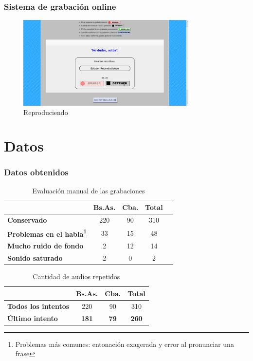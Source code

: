 \documentclass[mathserif]{beamer}%
\begin{document}
\begin{frame}
	\frametitle{Sistema de grabación online}
	
	\begin{figure}[h!]
		\centerline{\includegraphics[width=0.8\textwidth]{pag-play1} }
		\caption{Reproduciendo}
		\label{figEncuesta}
	\end{figure}
\end{frame}

\section{Datos}

\begin{frame}
	\frametitle{Datos obtenidos}
	
	\begin{table}[h]
		\centering
		\begin{tabular}{|l|c|c|c|c|}
			\hline
			\textbf{}  & \textbf{Bs.As. } & \textbf{Cba.} & \textbf{Total} \\ \hline
			\textbf{Conservado}  & 220 & 90 & 310 \\ \hline
			\textbf{Problemas en el habla\footnote{Problemas más comunes: entonación exagerada y error al pronunciar una frase}}  & 33 & 15 & 48 \\ \hline
			\textbf{Mucho ruido de fondo}  & 2 & 12 & 14 \\ \hline
			\textbf{Sonido saturado}  & 2 & 0 & 2 \\ \hline
		\end{tabular}
		\caption{Evaluación manual de las grabaciones}
		\label{eva_table}
	\end{table}
	
	\begin{table}[H]
		\centering
		\begin{tabular}{|l|c|c|c|}
			\hline
			\textbf{}  & \textbf{Bs.As. } & \textbf{Cba.} & \textbf{Total} \\ \hline
			\textbf{Todos los intentos}  & 220 & 90 & 310 \\ \hline
			\cellcolor{blue!25}\textbf{Último intento}  & \cellcolor{blue!25}\textbf{181} & \cellcolor{blue!25}\textbf{79} & \cellcolor{blue!25}\textbf{260} \\ \hline
		\end{tabular}
		\caption{Cantidad de audios repetidos}
		\label{eva_table_rep}
	\end{table}
\end{frame}
\end{document}
